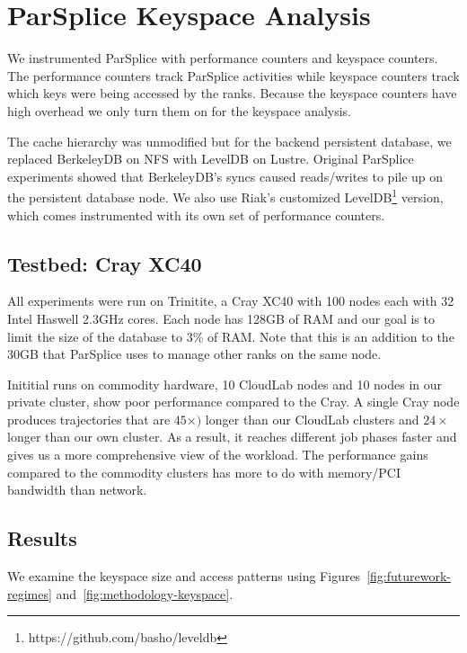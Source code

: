 \section{ParSplice Keyspace Analysis}

We instrumented ParSplice with performance counters and keyspace counters.  The
performance counters track ParSplice activities while keyspace counters track
which keys were being accessed by the ranks. Because the keyspace counters have
high overhead we only turn them on for the keyspace analysis.

The cache hierarchy was unmodified but for the backend persistent database, we
replaced BerkeleyDB on NFS with LevelDB on Lustre. Original ParSplice
experiments showed that BerkeleyDB's syncs caused reads/writes to pile up on
the persistent database node. We also use Riak's customized
LevelDB\footnote{https://github.com/basho/leveldb} version, which comes
instrumented with its own set of performance counters.

\subsection*{Testbed: Cray XC40}

All experiments were run on Trinitite, a Cray XC40 with 100 nodes each with 32
Intel Haswell 2.3GHz cores.  Each node has 128GB of RAM and our goal is to
limit the size of the database to 3\% of RAM. Note that this is an addition to
the 30GB that ParSplice uses to manage other ranks on the same node. 

Inititial runs on commodity hardware, 10 CloudLab nodes and 10 nodes in our
private cluster, show poor performance compared to the Cray. A single Cray node
produces trajectories that are \(45\times)\) longer than our CloudLab clusters
and \(24\times\) longer than our own cluster. As a result, it reaches different
job phases faster and gives us a more comprehensive view of the workload. The
performance gains compared to the commodity clusters has more to do with
memory/PCI bandwidth than network.

\subsection*{Results}
We examine the keyspace size and access patterns using
Figures~\ref{fig:futurework-regimes} and~\ref{fig:methodology-keyspace}.

